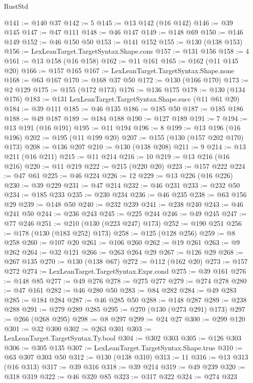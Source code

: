 \begin{lexlean}{RustStd}
\begin{coremodule}
{\begin{coremodule}
{{{{{{{{{{{{{{{{{{{{@141 := @140 @37
@142 := 5
@145 := @13 @142 (@16 @142)
@146 := @39 @145
@147 := @47 @111
@148 := @46 @147
@149 := @148 @69
@150 := @146 @149
@152 := @46 @150 @50
@153 := @141 @152
@155 := @130 (@138 @153)
@156 := LexLeanTarget.TargetSyntax.Shape.cons
@157 := @131 @156
@158 := 4
@161 := @13 @158 (@16 @158)
@162 := @11 @161
@165 := @162 (@11 @145 @20)
@166 := @157 @165
@167 := LexLeanTarget.TargetSyntax.Shape.none
@168 := @63 @167
@170 := @168 @37 @50
@172 := @130 (@166 @170)
@173 := @2 @129
@175 := @155 (@172 @173)
@176 := @136 @175
@178 := @130 (@134 @176)
@183 := @131 LexLeanTarget.TargetSyntax.Shape.succ (@11 @61 @20)
@184 := @39 @111
@185 := @46 @135
@186 := @185 @50
@187 := @185 @186
@188 := @49 @187
@189 := @184 @188
@190 := @127 @189
@191 := 7
@194 := @13 @191 (@16 @191)
@195 := @11 @194
@196 := 8
@199 := @13 @196 (@16 @196)
@202 := @195 (@11 @199 @20)
@207 := @155 (@130 (@157 @202 @170) @173)
@208 := @136 @207
@210 := @130 (@138 @208)
@211 := 9
@214 := @13 @211 (@16 @211)
@215 := @11 @214
@216 := 10
@219 := @13 @216 (@16 @216)
@220 := @11 @219
@222 := @215 (@220 @20)
@223 := @157 @222
@224 := @47 @61
@225 := @46 @224
@226 := 12
@229 := @13 @226 (@16 @226)
@230 := @39 @229
@231 := @47 @214
@232 := @46 @231
@233 := @232 @50
@234 := @185 @233
@235 := @230 @234
@236 := @46 @235
@238 := @63 @156 @29
@239 := @148 @50
@240 := @232 @239
@241 := @238 @240
@243 := @46 @241 @50
@244 := @236 @243
@245 := @225 @244
@246 := @49 @245
@247 := @77 @246
@251 := @210 (@130 (@223 @247) @173)
@252 := @190 @251
@256 := @178 (@130 (@183 @252) @173)
@258 := @125 (@128 @256)
@259 := @8 @258
@260 := @107 @20
@261 := @106 @260
@262 := @19 @261
@263 := @9 @262
@264 := @32 @121
@266 := @263 @264 @29
@267 := @126 @29
@268 := @267 @135
@270 := @130 (@138 @67)
@272 := @112 (@162 @20)
@273 := @157 @272
@274 := LexLeanTarget.TargetSyntax.Expr.cond
@275 := @39 @161
@276 := @148 @85
@277 := @49 @276
@278 := @275 @277
@279 := @274 @278
@280 := @47 @161
@282 := @46 @280 @50
@283 := @84 @282
@284 := @49 @283
@285 := @184 @284
@287 := @46 @285 @50
@288 := @148 @287
@289 := @238 @288
@291 := @279 @289 @285
@295 := @270 (@130 (@273 @291) @173)
@297 := @266 (@268 @295)
@298 := @8 @297
@299 := @24 @27
@300 := @299 @120
@301 := @32 @300
@302 := @263 @301
@303 := LexLeanTarget.TargetSyntax.Ty.bool
@304 := @302 @303
@305 := @126 @303
@306 := @305 @135
@307 := LexLeanTarget.TargetSyntax.Shape.true
@310 := @63 @307 @303 @50
@312 := @130 (@138 @310)
@313 := 11
@316 := @13 @313 (@16 @313)
@317 := @39 @316
@318 := @39 @214
@319 := @49 @239
@320 := @318 @319
@322 := @46 @320 @85
@323 := @317 @322
@324 := @274 @323
}}}}}}}}}}}}}}}}}}}}
\end{coremodule}}
\end{coremodule}
\end{lexlean}

